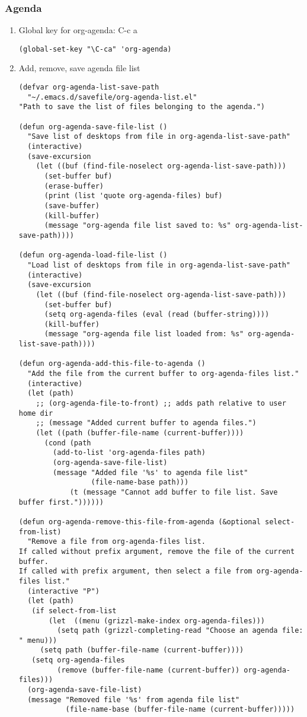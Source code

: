 \documentclass[nofonts]{tufte-handout}
\begin{document}
\subsubsection{Agenda}
\label{sec-2-5-8}
\begin{enumerate}
\item Global key for org-agenda: C-c a
\label{sec-2-5-8-1}
\begin{verbatim}
(global-set-key "\C-ca" 'org-agenda)
\end{verbatim}
\item Add, remove, save agenda file list
\label{sec-2-5-8-2}

\begin{verbatim}
(defvar org-agenda-list-save-path
  "~/.emacs.d/savefile/org-agenda-list.el"
"Path to save the list of files belonging to the agenda.")

(defun org-agenda-save-file-list ()
  "Save list of desktops from file in org-agenda-list-save-path"
  (interactive)
  (save-excursion
    (let ((buf (find-file-noselect org-agenda-list-save-path)))
      (set-buffer buf)
      (erase-buffer)
      (print (list 'quote org-agenda-files) buf)
      (save-buffer)
      (kill-buffer)
      (message "org-agenda file list saved to: %s" org-agenda-list-save-path))))

(defun org-agenda-load-file-list ()
  "Load list of desktops from file in org-agenda-list-save-path"
  (interactive)
  (save-excursion
    (let ((buf (find-file-noselect org-agenda-list-save-path)))
      (set-buffer buf)
      (setq org-agenda-files (eval (read (buffer-string))))
      (kill-buffer)
      (message "org-agenda file list loaded from: %s" org-agenda-list-save-path))))

(defun org-agenda-add-this-file-to-agenda ()
  "Add the file from the current buffer to org-agenda-files list."
  (interactive)
  (let (path)
    ;; (org-agenda-file-to-front) ;; adds path relative to user home dir
    ;; (message "Added current buffer to agenda files.")
    (let ((path (buffer-file-name (current-buffer))))
      (cond (path
        (add-to-list 'org-agenda-files path)
        (org-agenda-save-file-list)
        (message "Added file '%s' to agenda file list"
                 (file-name-base path)))
            (t (message "Cannot add buffer to file list. Save buffer first."))))))

(defun org-agenda-remove-this-file-from-agenda (&optional select-from-list)
  "Remove a file from org-agenda-files list.
If called without prefix argument, remove the file of the current buffer.
If called with prefix argument, then select a file from org-agenda-files list."
  (interactive "P")
  (let (path)
   (if select-from-list
       (let  ((menu (grizzl-make-index org-agenda-files)))
         (setq path (grizzl-completing-read "Choose an agenda file: " menu)))
     (setq path (buffer-file-name (current-buffer))))
   (setq org-agenda-files
         (remove (buffer-file-name (current-buffer)) org-agenda-files)))
  (org-agenda-save-file-list)
  (message "Removed file '%s' from agenda file list"
           (file-name-base (buffer-file-name (current-buffer)))))


\end{verbatim}
\end{enumerate}
\end{document}
